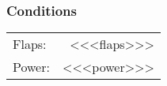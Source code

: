 % 
% 
%
 \subsubsection*{Conditions}
 \noindent\begin{tabular}{p{1.5 in}r}
 Flaps:&<<<flaps>>>\\
 Power:&<<<power>>>\\
 \end{tabular}
